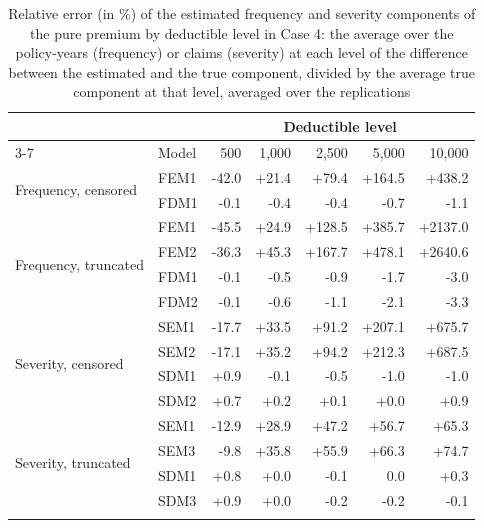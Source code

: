 \begin{table}[!ht]
\footnotesize
\centering
{\color{blue}
\begin{tabular}{llrrrrr}
\toprule
 & & \multicolumn{5}{c}{Deductible level} \\
\cmidrule(lr){3-7}
 & Model &    500 &  1,000 &  2,500 &  5,000 & 10,000 \\
\midrule
\multirow{2}{*}{Frequency, censored} & FEM1 & -42.0 & +21.4 & +79.4 & +164.5 & +438.2 \\
 & FDM1 & -0.1 & -0.4 & -0.4 & -0.7 & -1.1 \\
\midrule
\multirow{4}{*}{Frequency, truncated} & FEM1 & -45.5 & +24.9 & +128.5 & +385.7 & +2137.0 \\
 & FEM2 & -36.3 & +45.3 & +167.7 & +478.1 & +2640.6 \\
 & FDM1 & -0.1 & -0.5 & -0.9 & -1.7 & -3.0 \\
 & FDM2 & -0.1 & -0.6 & -1.1 & -2.1 & -3.3 \\
\midrule
\multirow{4}{*}{Severity, censored} & SEM1 & -17.7 & +33.5 & +91.2 & +207.1 & +675.7 \\
 & SEM2 & -17.1 & +35.2 & +94.2 & +212.3 & +687.5 \\
 & SDM1 & +0.9 & -0.1 & -0.5 & -1.0 & -1.0 \\
 & SDM2 & +0.7 & +0.2 & +0.1 & +0.0 & +0.9 \\
\midrule
\multirow{4}{*}{Severity, truncated} & SEM1 & -12.9 & +28.9 & +47.2 & +56.7 & +65.3 \\
 & SEM3 & -9.8 & +35.8 & +55.9 & +66.3 & +74.7 \\
 & SDM1 & +0.8 & +0.0 & -0.1 & 0.0 & +0.3 \\
 & SDM3 & +0.9 & +0.0 & -0.2 & -0.2 & -0.1 \\
\hhline{=======}
\end{tabular}
}
\caption{Relative error (in \%) of the estimated frequency and severity components of the pure premium by deductible level in Case 4: the average over the policy-years (frequency) or claims (severity) at each level of the difference between the estimated and the true component, divided by the average true component at that level, averaged over the replications}\label{tab:bylevel4}
\end{table}

